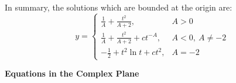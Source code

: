 {\begin{Solution}
    In summary, the solutions which are bounded at the origin are:
    \[
    \boxed{
      y =
      \begin{cases}
        \frac{1}{A} + \frac{t^2}{A+2}, &A > 0 
        \\
        \frac{1}{A} + \frac{t^2}{A+2} + c t^{-A}, &A < 0,\ A \neq -2 
        \\
        - \frac{1}{2} + t^2 \ln t + c t^2, &A = -2
      \end{cases}
      }
    \]
  \end{Solution}






  \begin{large}
    \noindent
    \textbf{Equations in the Complex Plane}
  \end{large}




  \begin{Solution}  
    \label{solution dwdz + sin z z w}

    $\phantom{a}$   %


\end{Solution}}
